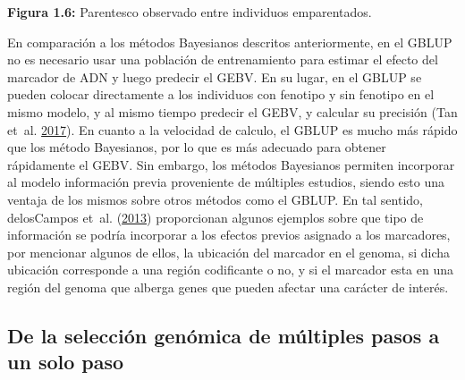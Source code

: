 \documentclass[11pt,spanish,a4paper,oneside,]{book} %
\begin{document}
\begin{center}
\textbf{Figura 1.6:} Parentesco observado entre individuos emparentados.

\end{center}

En comparación a los métodos Bayesianos descritos anteriormente, en el GBLUP no es necesario usar una población de entrenamiento para estimar el efecto del marcador de ADN y luego predecir el GEBV. En su lugar, en el GBLUP se pueden colocar directamente a los individuos con fenotipo y sin fenotipo en el mismo modelo, y al mismo tiempo predecir el GEBV, y calcular su precisión (Tan et~al. \protect\hyperlink{ref-cite:34}{2017}). En cuanto a la velocidad de calculo, el GBLUP es mucho más rápido que los método Bayesianos, por lo que es más adecuado para obtener rápidamente el GEBV. Sin embargo, los métodos Bayesianos permiten incorporar al modelo información previa proveniente de múltiples estudios, siendo esto una ventaja de los mismos sobre otros métodos como el GBLUP. En tal sentido, delosCampos et~al. (\protect\hyperlink{ref-cite:31}{2013}) proporcionan algunos ejemplos sobre que tipo de información se podría incorporar a los efectos previos asignado a los marcadores, por mencionar algunos de ellos, la ubicación del marcador en el genoma, si dicha ubicación corresponde a una región codificante o no, y si el marcador esta en una región del genoma que alberga genes que pueden afectar una carácter de interés.

\hypertarget{de-la-selecciuxf3n-genuxf3mica-de-muxfaltiples-pasos-a-un-solo-paso}{%
\subsection{De la selección genómica de múltiples pasos a un solo paso}\label{de-la-selecciuxf3n-genuxf3mica-de-muxfaltiples-pasos-a-un-solo-paso}}
\end{document}

